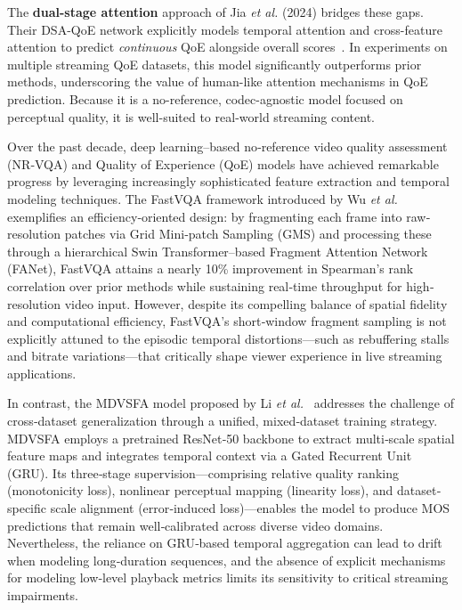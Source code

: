 The \textbf{dual-stage attention} approach of Jia \textit{et al.} (2024) bridges these gaps. Their DSA-QoE network explicitly models temporal attention and cross-feature attention to predict \textit{continuous} QoE alongside overall scores~\cite{jia2024continuous}. In experiments on multiple streaming QoE datasets, this model significantly outperforms prior methods, underscoring the value of human-like attention mechanisms in QoE prediction. Because it is a no-reference, codec-agnostic model focused on perceptual quality, it is well-suited to real-world streaming content.

Over the past decade, deep learning–based no‐reference video quality assessment (NR‐VQA) and Quality of Experience (QoE) models have achieved remarkable progress by leveraging increasingly sophisticated feature extraction and temporal modeling techniques. The FastVQA framework introduced by Wu \textit{et al.}~\cite{wu2022fastvqa} exemplifies an efficiency‐oriented design: by fragmenting each frame into raw‐resolution patches via Grid Mini‐patch Sampling (GMS) and processing these through a hierarchical Swin Transformer–based Fragment Attention Network (FANet), FastVQA attains a nearly 10\% improvement in Spearman’s rank correlation over prior methods while sustaining real‐time throughput for high‐resolution video input. However, despite its compelling balance of spatial fidelity and computational efficiency, FastVQA’s short‐window fragment sampling is not explicitly attuned to the episodic temporal distortions—such as rebuffering stalls and bitrate variations—that critically shape viewer experience in live streaming applications.

In contrast, the MDVSFA model proposed by Li \textit{et al.}~\cite{li2023unified} addresses the challenge of cross‐dataset generalization through a unified, mixed‐dataset training strategy. MDVSFA employs a pretrained ResNet‐50 backbone to extract multi‐scale spatial feature maps and integrates temporal context via a Gated Recurrent Unit (GRU). Its three‐stage supervision—comprising relative quality ranking (monotonicity loss), nonlinear perceptual mapping (linearity loss), and dataset‐specific scale alignment (error‐induced loss)—enables the model to produce MOS predictions that remain well‐calibrated across diverse video domains. Nevertheless, the reliance on GRU‐based temporal aggregation can lead to drift when modeling long‐duration sequences, and the absence of explicit mechanisms for modeling low‐level playback metrics limits its sensitivity to critical streaming impairments.

